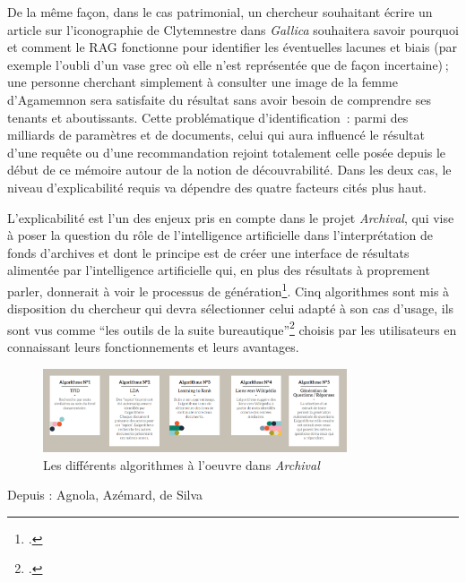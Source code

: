 De la même façon, dans le cas patrimonial, un chercheur souhaitant écrire un article sur l’iconographie de Clytemnestre dans \textit{Gallica} souhaitera savoir pourquoi et comment le RAG fonctionne pour identifier les éventuelles lacunes et biais (par exemple l’oubli d’un vase grec où elle n’est représentée que de façon incertaine) ; une personne cherchant simplement à consulter une image de la femme d’Agamemnon sera satisfaite du résultat sans avoir besoin de comprendre ses tenants et aboutissants. Cette problématique d’identification : parmi des milliards de paramètres et de documents, celui qui aura influencé le résultat d’une requête ou d’une recommandation rejoint totalement celle posée depuis le début de ce mémoire autour de la notion de découvrabilité. Dans les deux cas, le niveau d’explicabilité requis va dépendre des quatre facteurs cités plus haut. 

L’explicabilité est l’un des enjeux pris en compte dans le projet \textit{Archival}, qui vise à poser la question du rôle de l’intelligence artificielle dans l’interprétation de fonds d’archives et dont le principe est de créer une interface de résultats alimentée par l’intelligence artificielle qui, en plus des résultats à proprement parler, donnerait à voir le processus de génération\footcite[p. 46]{besnehard_evaluer_nodate}. Cinq algorithmes sont mis à disposition du chercheur qui devra sélectionner celui adapté à son cas d’usage, ils sont vus comme \enquote{les outils de la suite bureautique}\footcite[p. 9]{agnola_ia_2022} choisis par les utilisateurs en connaissant leurs fonctionnements et leurs avantages. 


\begin{figure}[h!]
	\centering
	\includegraphics[width=0.8\textwidth]{images/image27.png}
	\caption{Les différents algorithmes à l'oeuvre dans \textit{Archival}}
	\label{fig:image27}
\end{figure}

\begin{center}
	Depuis : Agnola, Azémard, de Silva
\end{center}


